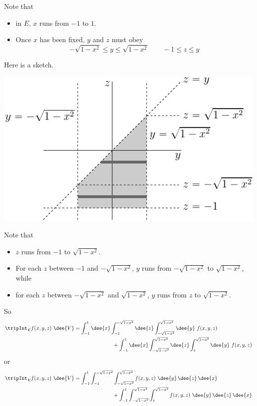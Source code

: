 \begin{solution}
Note that
\begin{itemize}
\item
  in $E$, $x$ runs from $-1$ to $1$.
\item 
  Once $x$ has been fixed, $y$ and $z$ must obey
   \begin{equation*}
       -\sqrt{1-x^2}\le y\le\sqrt{1-x^2}\qquad -1\le z\le y 
   \end{equation*}
\end{itemize}
Here is a sketch.
\begin{center}
\includegraphics{fig/OE15D_7CC.pdf}
\end{center}
Note that
\begin{itemize}
\item
    $z$ runs from $-1$ to  $\sqrt{1-x^2}$.
\item
    For each $z$ between $-1$ and $-\sqrt{1-x^2}$, $y$ runs from 
    $-\sqrt{1-x^2}$ to $\sqrt{1-x^2}$, while
\item
    for each $z$ between $-\sqrt{1-x^2}$ and $\sqrt{1-x^2}$, $y$ runs from 
    $z$ to $\sqrt{1-x^2}$.
\end{itemize}
So 
\begin{align*}
\tripInt_E f(x,y,z)\ \dee{V}
&=\int_{-1}^1\dee{x} \int_{-1}^{-\sqrt{1-x^2}}\dee{z}  
                     \int_{-\sqrt{1-x^2}}^{\sqrt{1-x^2}}\dee{y}  \ f(x,y,z) \\
&\hskip1in  +\int_{-1}^1\dee{x} \int_{-\sqrt{1-x^2}}^{\sqrt{1-x^2}}\dee{z}  
                    \int_z^{\sqrt{1-x^2}}\dee{y}  \ f(x,y,z) 
\end{align*}
or
\begin{align*}
\tripInt_E f(x,y,z)\ \dee{V}
&=\int_{-1}^1 \int_{-1}^{-\sqrt{1-x^2}} \int_{-\sqrt{1-x^2}}^{\sqrt{1-x^2}}
              f(x,y,z)\ \dee{y}\,\dee{z}\,\dee{x} \\
&\hskip1in  +\int_{-1}^1 \int_{-\sqrt{1-x^2}}^{\sqrt{1-x^2}}
                    \int_z^{\sqrt{1-x^2}}  f(x,y,z)\ \dee{y}\,\dee{z}\,\dee{x} 
\end{align*}
\end{solution}


